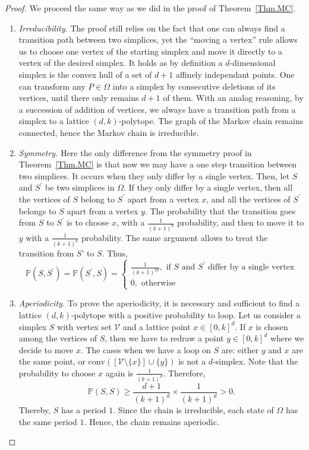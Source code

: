 \documentclass[a4paper]{article}
\begin{document}
\begin{proof}
  We proceed the same way as we did in the proof of Theorem~\ref{Thm.MC}.

  \begin{enumerate}[i]
    \item \textit{Irreducibility.}
    The proof still relies on the fact that one can always find a transition path between two simplices, yet the ``moving a vertex'' rule allows us to choose one vertex of the starting simplex and move it directly to a vertex of the desired simplex. It holds as by definition a $d$-dimensional simplex is the convex hull of a set of $d+1$ affinely independant points. One can transform any $P\in\Omega$ into a simplex by consecutive deletions of its vertices, until there only remains $d+1$ of them. With an analog reasoning, by a succession of addition of vertices, we always have a transition path from a simplex to a lattice $(d,k)$-polytope. The graph of the Markov chain remains connected, hence the Markov chain is irreducible.

    \item \textit{Symmetry.}
    Here the only difference from the symmetry proof in Theorem~\ref{Thm.MC} is that now we may have a one step transition between two simplices. It occurs when they only differ by a single vertex. Then, let $S$ and $S^\prime$ be two simplices in $\Omega$. If they only differ by a single vertex, then all the vertices of $S$ belong to $S^\prime$ apart from a vertex $x$, and all the vertices of $S^\prime$ belongs to $S$ apart from a vertex $y$. The probability that the transition goes from $S$ to $S^\prime$ is to choose $x$, with a $\frac{1}{(k+1)^d}$ probability, and then to move it to $y$ with a $\frac{1}{(k+1)^d}$ probability. The same argument allows to treat the transition from $S’$ to $S$. Thus,
    $$
      \mathbb{P}(S,S^\prime)=\mathbb{P}(S^\prime,S)=
      \begin{cases}
        \displaystyle\frac{1}{(k+1)^{2d}} , \text{ if } S \text{ and } S^\prime \text{ differ by a single vertex}\\
        0, \text{ otherwise}
      \end{cases}
    $$

    \item \textit{Aperiodicity.}
    To prove the aperiodicity, it is necessary and sufficient to find a lattice $(d,k)$-polytope with a positive probability to loop. Let us consider a simplex $S$ with vertex set $\mathcal{V}$ and a lattice point $x \in [0,k]^d$. If $x$ is chosen among the vertices of $S$, then we have to redraw a point $y\in [0,k]^d$ where we decide to move $x$. The cases when we have a loop on $S$ are: either $y$ and $x$ are the same point, or $\mathrm{conv}([\mathcal{V}\mathord{\setminus}\{x\}]\cup\{y\})$ is not a $d$-simplex. Note that the probability to choose $x$ again is $\frac{1}{(k+1)^d}$.
    Therefore,
    $$
      \mathbb{P}(S,S)\geq{\frac{d+1}{(k+1)^d}\times\frac{1}{(k+1)^d}}>0.
    $$
    Thereby, $S$ has a period $1$. Since the chain is irreducible, each state of $\Omega$ has the same period $1$. Hence, the chain remains aperiodic.
  \end{enumerate}
\end{proof}
\end{document}
